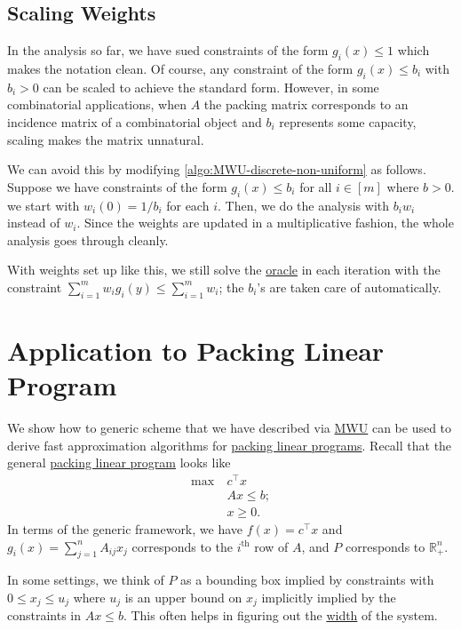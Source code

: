 \subsection{Scaling Weights}
In the analysis so far, we have sued constraints of the form \(g_i(x) \leq 1\) which makes the notation clean. Of course, any constraint of the form \(g_i(x) \leq b_i\) with \(b_i > 0\) can be scaled to achieve the standard form. However, in some combinatorial applications, when \(A\) the packing matrix corresponds to an incidence matrix of a combinatorial object and \(b_i\) represents some capacity, scaling makes the matrix unnatural.

We can avoid this by modifying \autoref{algo:MWU-discrete-non-uniform} as follows. Suppose we have constraints of the form \(g_i(x) \leq b_i\) for all \(i \in [m]\) where \(b > 0\). we start with \(w_i(0) = 1 / b_i\) for each \(i\). Then, we do the analysis with \(b_i w_i\) instead of \(w_i\). Since the weights are updated in a multiplicative fashion, the whole analysis goes through cleanly.

\begin{note}
	With weights set up like this, we still solve the \hyperref[eq:MWU-oracle]{oracle} in each iteration with the constraint \(\sum_{i=1}^{m} w_i g_i(y) \leq \sum_{i=1}^{m} w_i\); the \(b_i\)'s are taken care of automatically.
\end{note}

\section{Application to Packing Linear Program}
We show how to generic scheme that we have described via \hyperref[algo:MWU-discrete-non-uniform]{MWU} can be used to derive fast approximation algorithms for \hyperref[def:packing-LP]{packing linear programs}. Recall that the general \hyperref[def:packing-LP]{packing linear program} looks like
\[
	\begin{aligned}
		\max~ & c^{\top} x  \\
		      & Ax \leq b ; \\
		      & x \geq 0.
	\end{aligned}
\]
In terms of the generic framework, we have \(f(x) = c^{\top} x\) and \(g_i(x) = \sum_{j=1}^{n} A_{ij} x_j\) corresponds to the \(i^{\text{th} }\) row of \(A\), and \(P\) corresponds to \(\mathbb{R} _{+}^n\).

\begin{note}
	In some settings, we think of \(P\) as a bounding box implied by constraints with \(0 \leq x_j \leq u_j\) where \(u_j\) is an upper bound on \(x_j\) implicitly implied by the constraints in \(Ax \leq b\). This often helps in figuring out the \hyperref[def:width]{width} of the system.
\end{note}

